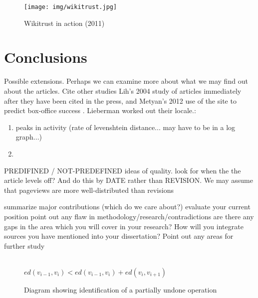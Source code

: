 \documentclass[a4paper,11pt,twoside,notitlepage]{article}
\begin{document}
       \begin{figure}
         \centering
         \texttt{[image: img/wikitrust.jpg]}
         \caption{Wikitrust in action (2011)}
         \label{fig:wikitrust}
       \end{figure}

 \cite{Lucassen2011} 

        \section{Conclusions}
        Possible extensions.  Perhaps we can examine more about what
        we may find out about the articles. Cite other studies Lih's
        2004 study of articles immediately after they have been cited
        in the press\cite{Lih2004}, and Metyan's 2012 use of the site
        to predict box-office success \cite{Mestyan2012}. Lieberman
        worked out their locale.\cite{Lieberman2009}:

        \begin{enumerate}
          \item peaks in activity (rate of levenshtein distance... may
            have to be in a log graph...)
          \item 
        \end{enumerate}

        PREDIFINED / NOT-PREDEFINED ideas of quality. look for when
        the the article levels off? And do this by DATE rather than
        REVISION. We may assume that pageviews are more
        well-distributed than revisions

        summarize major contributions (which do we care about?)
        evaluate your current position point out any flaw in
        methodology/research/contradictions are there any gaps in the
        area which you will cover in your research?  How will you
        integrate sources you have mentioned into your dissertation?
        Point out any areas for further study

        \begin{figure}[h!]
          \centering
          \\$ed(v_{i-1},v_i) < ed(v_{i-1},v_i) + ed(v_{i},v_{i+1})$
          \caption{Diagram showing identification of a partially
            undone operation}
          \label{fig:part-undo}
        \end{figure}
\end{document}
